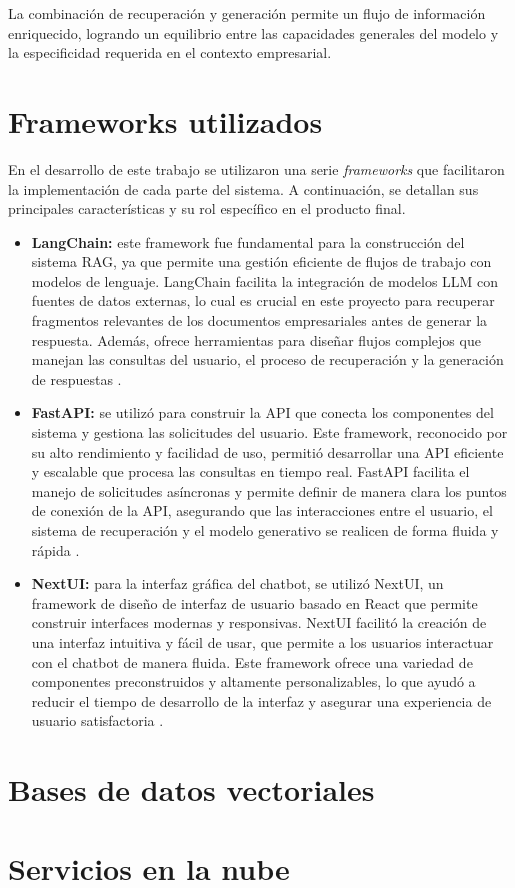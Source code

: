 La combinación de recuperación y generación permite un flujo de información enriquecido, logrando un equilibrio 
entre las capacidades generales del modelo y la especificidad requerida en el contexto empresarial.

\section{Frameworks utilizados}

En el desarrollo de este trabajo se utilizaron una serie \textit{frameworks} que facilitaron la implementación de 
cada parte del sistema. A continuación, se detallan sus principales características y su rol específico en el producto final.

\begin{itemize}
	\item \textbf{LangChain:} este framework fue fundamental para la construcción del sistema RAG, ya que permite una gestión 
	eficiente de flujos de trabajo con modelos de lenguaje. LangChain facilita la integración de modelos LLM con fuentes de datos externas, 
	lo cual es crucial en este proyecto para recuperar fragmentos relevantes de los documentos empresariales 
	antes de generar la respuesta. Además, ofrece herramientas para diseñar flujos complejos 
	que manejan las consultas del usuario, el proceso de recuperación y la generación de respuestas \citep{website:langchain}.
	\item \textbf{FastAPI:} se utilizó para construir la API que conecta los componentes del sistema y gestiona las solicitudes del usuario. 
	Este framework, reconocido por su alto rendimiento y facilidad de uso, permitió desarrollar una API eficiente y escalable que procesa 
	las consultas en tiempo real. FastAPI facilita el manejo de solicitudes asíncronas y permite definir de manera clara los puntos 
	de conexión de la API, asegurando que las interacciones entre el usuario, el sistema de recuperación y el modelo generativo se 
	realicen de forma fluida y rápida \citep{website:fastapi}.
	\item \textbf{NextUI:} para la interfaz gráfica del chatbot, se utilizó NextUI, un framework de diseño de interfaz de usuario 
	basado en React que permite construir interfaces modernas y responsivas. NextUI facilitó la creación de una interfaz intuitiva 
	y fácil de usar, que permite a los usuarios interactuar con el chatbot de manera fluida. Este framework ofrece una variedad de 
	componentes preconstruidos y altamente personalizables, lo que ayudó a reducir el tiempo de desarrollo de la interfaz y asegurar 
	una experiencia de usuario satisfactoria \citep{website:nextui}.
\end{itemize}

\section{Bases de datos vectoriales}

\section{Servicios en la nube}